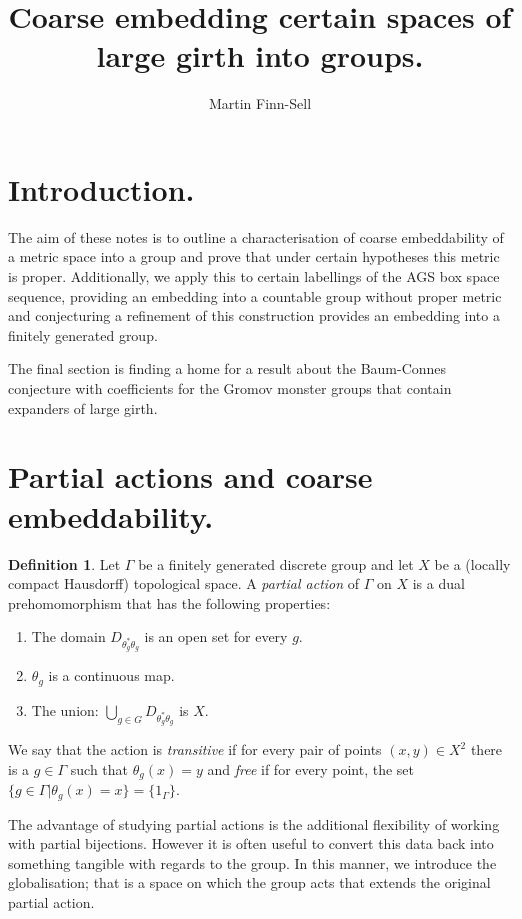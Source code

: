 \documentclass[11pt,a4paper]{amsart}
\title{Coarse embedding certain spaces of large girth into groups.}
\author{Martin Finn-Sell}
\theoremstyle{plain}
\theoremstyle{definition}%
\newtheorem{definition}[theorem]{Definition}%
\theoremstyle{remark}%
\begin{document}
\maketitle

\section{Introduction.}

The aim of these notes is to outline a characterisation of coarse embeddability of a metric space into a group and prove that under certain hypotheses this metric is proper. Additionally, we apply this to certain labellings of the AGS box space sequence, providing an embedding into a countable group without proper metric and conjecturing a refinement of this construction provides an embedding into a finitely generated group.

The final section is finding a home for a result about the Baum-Connes conjecture with coefficients for the Gromov monster groups that contain expanders of large girth. 

\section{Partial actions and coarse embeddability.}

\begin{definition}
Let $\Gamma$ be a finitely generated discrete group and let $X$ be a (locally compact Hausdorff) topological space. A \textit{partial action} of $\Gamma$ on $X$ is a dual prehomomorphism that has the following properties:
\begin{enumerate}
\item The domain $D_{\theta_{g}^{*}\theta_{g}}$ is an open set for every $g$.
\item $\theta_{g}$ is a continuous map.
\item The union: $\bigcup_{g \in G}D_{\theta_{g}^{*}\theta_{g}}$ is $X$.
\end{enumerate}
We say that the action is \textit{transitive} if for every pair of points $(x,y) \in X^{2}$ there is a $g\in \Gamma$ such that $\theta_{g}(x)=y$ and \textit{free} if for every point, the set $\lbrace g \in \Gamma | \theta_{g}(x)=x \rbrace=\lbrace 1_{\Gamma} \rbrace$.
\end{definition}

The advantage of studying partial actions is the additional flexibility of working with partial bijections. However it is often useful to convert this data back into something tangible with regards to the group. In this manner, we introduce the globalisation; that is a space on which the group acts that extends the original partial action.
\end{document}
